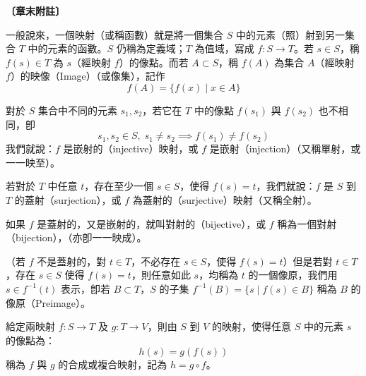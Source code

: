 \vspace{1.5em}
\noindent\textbf{〔章末附註〕}\label{note:b4-ch1-p57-appendix-note}

一般說來，一個映射（或稱函數）就是將一個集合 $S$ 中的元素（照）射到另一集合 $T$ 中的元素的函數。$S$ 仍稱為定義域；$T$ 為值域，寫成 $f: S \to T$。若 $s \in S$，稱 $f(s) \in T$ 為 $s$（經映射 $f$）的像點。而若 $A \subset S$，稱 $f(A)$ 為集合 $A$（經映射 $f$）的映像（Image）（或像集），記作
\[ f(A) = \{f(x) \mid x \in A\} \]

對於 $S$ 集合中不同的元素 $s_1, s_2$，若它在 $T$ 中的像點 $f(s_1)$ 與 $f(s_2)$ 也不相同，卽
\[ s_1, s_2 \in S, \; s_1 \neq s_2 \implies f(s_1) \neq f(s_2) \]
我們就說：$f$ 是嵌射的（injective）映射，或 $f$ 是嵌射（injection）（又稱單射，或一一映至）。

若對於 $T$ 中任意 $t$，存在至少一個 $s \in S$，使得 $f(s) = t$，我們就說：$f$ 是 $S$ 到 $T$ 的蓋射（surjection），或 $f$ 為蓋射的（surjective）映射（又稱全射）。

如果 $f$ 是蓋射的，又是嵌射的，就叫對射的（bijective），或 $f$ 稱為一個對射（bijection），（亦卽一一映成）。

（若 $f$ 不是蓋射的，對 $t \in T$，不必存在 $s \in S$，使得 $f(s) = t$）但是若對 $t \in T$，存在 $s \in S$ 使得 $f(s) = t$，則任意如此 $s$，均稱為 $t$ 的一個像原，我們用 $s \in f^{-1}(t)$ 表示，卽若 $B \subset T$，$S$ 的子集 $f^{-1}(B) = \{s \mid f(s) \in B\}$ 稱為 $B$ 的像原（Preimage）。

給定兩映射 $f: S \to T$ 及 $g: T \to V$，則由 $S$ 到 $V$ 的映射，使得任意 $S$ 中的元素 $s$ 的像點為：
\[ h(s) = g(f(s)) \]
稱為 $f$ 與 $g$ 的合成或複合映射，記為 $h = g \circ f$。
